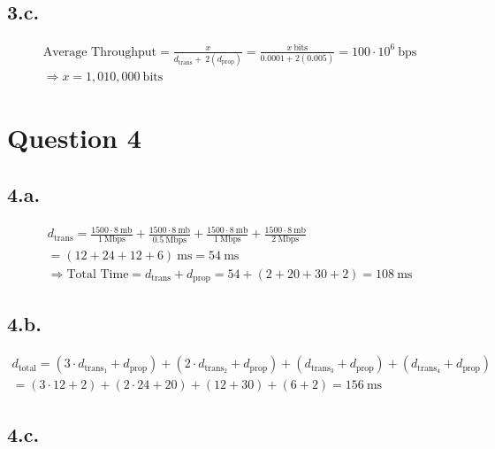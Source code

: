 \documentclass[12pt]{article}
\begin{document}
\subsection{3.c.}

\begin{gather}
    \text{Average Throughput} = \frac{x}{ d_{\text{trans}} + \ 2(d_{\text{prop}})} = \frac{x \ \text{bits}}{0.0001 + 2(0.005)} = 100 \cdot 10^6 \ \text{bps} \nonumber\\
    \Longrightarrow x = 1,010,000 \ \text{bits}
\end{gather}

\section{Question 4}


\subsection{4.a.}

\begin{gather}
    d_{\text{trans}} = \frac{1500 \cdot 8\ \text{mb}}{1 \ \text{Mbps}} + \frac{1500 \cdot 8\ \text{mb}}{0.5 \ \text{Mbps}} + \frac{1500 \cdot 8\ \text{mb}}{1 \ \text{Mbps}} + \frac{1500 \cdot 8\ \text{mb}}{2 \ \text{Mbps}} \\
    = (12 + 24 + 12 + 6) \ \text{ms} = 54 \ \text{ms} \nonumber\\
    \Longrightarrow \text{Total Time}  = d_{\text{trans}} + d_{\text{prop}} = 54 + (2 + 20 + 30 + 2) = 108 \ \text{ms}
\end{gather}


\subsection{4.b.}

\begin{gather}
    d_{\text{total}} = (3 \cdot d_{\text{trans}_{1}} + d_{\text{prop}}) + (2 \cdot d_{\text{trans}_{2}} + d_{\text{prop}}) + (d_{\text{trans}_{3}} + d_{\text{prop}}) + (d_{\text{trans}_{4}} + d_{\text{prop}}) \\
    = (3 \cdot 12 + 2) + (2 \cdot 24 + 20) + (12 + 30) + (6 + 2) = 156 \ \text{ms} \nonumber
\end{gather}

\subsection{4.c.}
\end{document}
